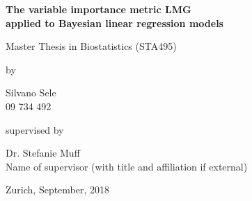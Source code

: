 \renewcommand\familydefault{\sfdefault} 


\thispagestyle{empty}
\renewcommand{\baselinestretch}{1.5}\normalfont
\begin{center}
\setlength{\parindent}{0cm}
\bf\Large%
The variable importance metric LMG  \\
applied to Bayesian linear regression models
\normalfont



\hrulefill

\vspace*{4cm}

\large
Master Thesis in Biostatistics (STA495) %
\vspace*{12mm}

by

\vspace*{12mm}

Silvano Sele\\
\small 09 734 492\\
\normalfont
\vspace*{4cm}

supervised by

\vspace*{1cm}

Dr. Stefanie Muff\\
Name of supervisor (with title and affiliation if external)

\vfill

Zurich, September, 2018
\end{center}
\renewcommand\familydefault{\rmdefault}%
\renewcommand{\baselinestretch}{1.0}\rm 
\setcounter{page}{0}
\newpage
\vspace*{12cm}~\thispagestyle{empty}
\newpage
